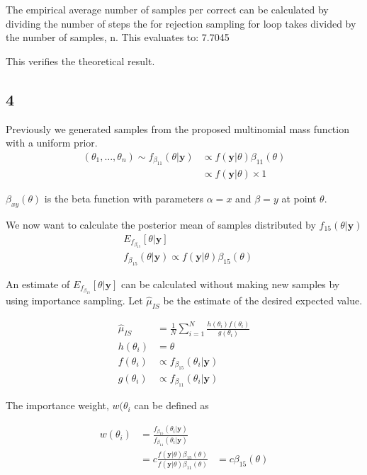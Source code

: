 The empirical average number of samples per correct can be calculated by dividing the number of steps the for rejection sampling for loop takes divided by the number of samples, n. This evaluates to: 7.7045

This verifies the theoretical result.

\subsection{4}

Previously we generated samples from the proposed multinomial mass function with a uniform prior. 
\begin{align}
    (\theta_1, ... , \theta_n) \sim f_{\beta_{11}}(\theta|\mathbf{y}) &\propto f(\mathbf{y}|\theta) \beta_{11}(\theta)\\
    &\propto f(\mathbf{y}|\theta) \times 1
\end{align}

$\beta_{xy}(\theta)$ is the beta function with parameters $\alpha = x$ and $\beta = y$ at point $\theta$.

We now want to calculate the posterior mean of samples distributed by $f_{15}(\theta|\mathbf{y})$
\begin{align}
    &E_{f_{\beta_{15}}}[\theta|\mathbf{y}]\\
    &f_{\beta_{15}}(\theta|\mathbf{y}) \propto f(\mathbf{y}|\theta) \beta_{15}(\theta)
\end{align}

An estimate of $E_{f_{\beta_{15}}}[\theta|\mathbf{y}]$ can be calculated without making new samples by using importance sampling. Let $\hat{\mu}_{IS}$ be the estimate of the desired expected value.

\begin{align}
    \hat{\mu}_{IS} &= \frac{1}{N} \sum_{i=1}^N \frac{h(\theta_i)f(\theta_i)}{g(\theta_i)}\\
    h(\theta_i) &= \theta\\
    f(\theta_i) &\propto f_{\beta_{15}}(\theta_i|\mathbf{y})\\
    g(\theta_i) &\propto f_{\beta_{11}}(\theta_i|\mathbf{y})
\end{align}

The importance weight, $w(\theta_i$ can be defined as

\begin{align}
    w(\theta_i) &= \frac{f_{\beta_{15}}(\theta_i|\mathbf{y})}{f_{\beta_{11}}(\theta_i|\mathbf{y})}\\
    &= c \frac{f(\mathbf{y}|\theta) \beta_{15}(\theta)}{f(\mathbf{y}|\theta) \beta_{11}(\theta)}
    &= c \beta_{15}(\theta)
\end{align}

